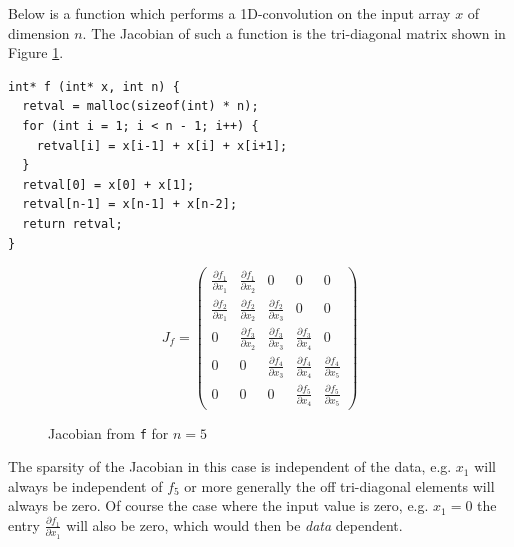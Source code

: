 Below is a function which performs a 1D-convolution on the input array $x$ of dimension $n$. 
The Jacobian of such a function is the tri-diagonal matrix shown in Figure \ref{fig:tridiag}. 
\begin{verbatim}
int* f (int* x, int n) {
  retval = malloc(sizeof(int) * n);
  for (int i = 1; i < n - 1; i++) {
    retval[i] = x[i-1] + x[i] + x[i+1];
  }
  retval[0] = x[0] + x[1];
  retval[n-1] = x[n-1] + x[n-2];
  return retval;
}
\end{verbatim}
\begin{figure}[H]
	$$ J_{f} = \left(\begin{matrix}
	\frac{\partial f_1}{\partial x_1} & \frac{\partial f_1}{\partial x_2} & 0 & 0 & 0 \\
	\frac{\partial f_2}{\partial x_1}& \frac{\partial f_2}{\partial x_2} & \frac{\partial f_2}{\partial x_3} & 0 & 0\\
	0 & \frac{\partial f_3}{\partial x_2} & \frac{\partial f_3}{\partial x_3} & \frac{\partial f_3}{\partial x_4} & 0\\
	0 & 0 & \frac{\partial f_4}{\partial x_3} & \frac{\partial f_4}{\partial x_4} & \frac{\partial f_4}{\partial x_5} \\
	0 & 0 & 0 & \frac{\partial f_5}{\partial x_4} & \frac{\partial f_5}{\partial x_5}
	\end{matrix}\right) $$
	\caption{Jacobian from \texttt{f} for $n=5$}
	\label{fig:tridiag}
\end{figure}
The sparsity of the Jacobian in this case is independent of the data, e.g. $x_1$ will always be independent of $f_5$ 
or more generally the off tri-diagonal elements will always be zero. 
Of course the case where the input value is zero, e.g. $x_1 = 0$  the entry $\frac{\partial f_1}{\partial x_1}$ will also be zero, 
which would then be \emph{data} dependent.

